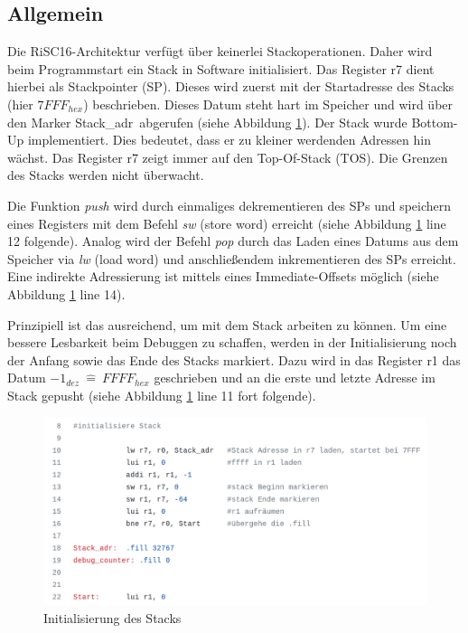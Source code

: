 \documentclass[fleqn, a4paper, 11pt]{article}       %
\begin{document}
\subsection{Allgemein}

Die RiSC16-Architektur verfügt über keinerlei Stackoperationen. Daher wird beim Programmstart ein Stack in Software initialisiert. Das Register r7 dient hierbei als Stackpointer (SP). Dieses wird zuerst mit der Startadresse des Stacks (hier $7FFF_{hex}$) beschrieben. Dieses Datum steht hart im Speicher und wird über den Marker \glqq Stack\_adr\grqq \ abgerufen (siehe  Abbildung \ref{fig:Stack}).
Der Stack wurde   Bottom-Up implementiert. Dies bedeutet, dass er zu kleiner werdenden Adressen hin wächst. Das Register r7 zeigt immer auf den Top-Of-Stack (TOS). Die Grenzen des Stacks werden nicht überwacht.

Die Funktion \emph{push}  wird durch einmaliges dekrementieren des SPs und speichern eines Registers mit dem Befehl \emph{sw} (store word) erreicht (siehe Abbildung \ref{fig:Stack} line 12 folgende). Analog wird der Befehl \emph{pop} durch das Laden eines Datums aus dem Speicher via \emph{lw} (load word) und anschließendem inkrementieren des SPs erreicht. Eine indirekte Adressierung ist mittels eines Immediate-Offsets möglich (siehe Abbildung \ref{fig:Stack} line 14).

Prinzipiell ist das ausreichend, um mit dem Stack arbeiten zu können. Um eine bessere Lesbarkeit beim Debuggen zu schaffen, werden in der Initialisierung noch der Anfang sowie das Ende des Stacks markiert. Dazu wird in das Register r1 das Datum $-1_{dez}\ \widehat{=}\ FFFF_{hex}$ geschrieben und an die erste und letzte Adresse im Stack gepusht (siehe Abbildung \ref{fig:Stack} line 11 fort folgende).

\begin{figure}[h]
    \includegraphics[width =1\textwidth]{Stack_init.png}
\caption{Initialisierung des Stacks}
\label{fig:Stack}
\end{figure}
\end{document}

